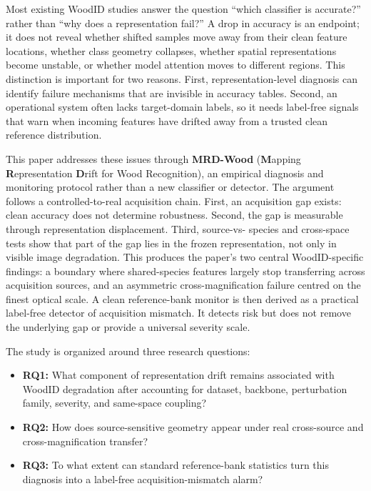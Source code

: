 \documentclass[a4paper,fleqn]{els-cas-templates/cas-sc}
\begin{document}
Most existing WoodID studies answer the question ``which classifier is accurate?'' rather than ``why does a representation fail?'' A drop in accuracy is an endpoint; it does not reveal whether shifted samples move away from their clean feature locations, whether class geometry collapses, whether spatial representations become unstable, or whether model attention moves to different regions. This distinction is important for two reasons. First, representation-level diagnosis can identify failure mechanisms that are invisible in accuracy tables. Second, an operational system often lacks target-domain labels, so it needs label-free signals that warn when incoming features have drifted away from a trusted clean reference distribution.

This paper addresses these issues through \textbf{MRD-Wood}
(\textbf{M}apping \textbf{R}epresentation \textbf{D}rift for Wood
Recognition), an empirical diagnosis and monitoring protocol rather than a new
classifier or detector. The argument follows a controlled-to-real acquisition
chain. First, an
acquisition gap exists: clean accuracy does not determine robustness. Second,
the gap is measurable through representation displacement. Third, source-vs-
species and cross-space tests show that part of the gap lies in the frozen
representation, not only in visible image degradation. This produces the
paper's two central WoodID-specific findings: a boundary where shared-species
features largely stop transferring across acquisition sources, and an asymmetric
cross-magnification failure centred on the finest optical scale. A clean
reference-bank monitor is then derived as a practical label-free detector of
acquisition mismatch. It detects risk but does not remove the underlying gap or
provide a universal severity scale.

The study is organized around three research questions:

\begin{itemize}
  \item \textbf{RQ1:} What component of representation drift remains associated
  with WoodID degradation after accounting for dataset, backbone, perturbation
  family, severity, and same-space coupling?
  \item \textbf{RQ2:} How does source-sensitive geometry appear under real
  cross-source and cross-magnification transfer?
  \item \textbf{RQ3:} To what extent can standard reference-bank statistics turn
  this diagnosis into a label-free acquisition-mismatch alarm?
\end{itemize}
\end{document}
